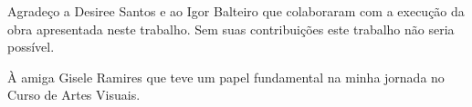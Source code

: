 \begin{agradecimento}

Agradeço a Desiree Santos e ao Igor Balteiro que colaboraram com a execução da obra apresentada neste trabalho. Sem suas contribuições este trabalho não seria possível.

À amiga Gisele Ramires que teve um papel fundamental na minha jornada no Curso de Artes Visuais.

\end{agradecimento}